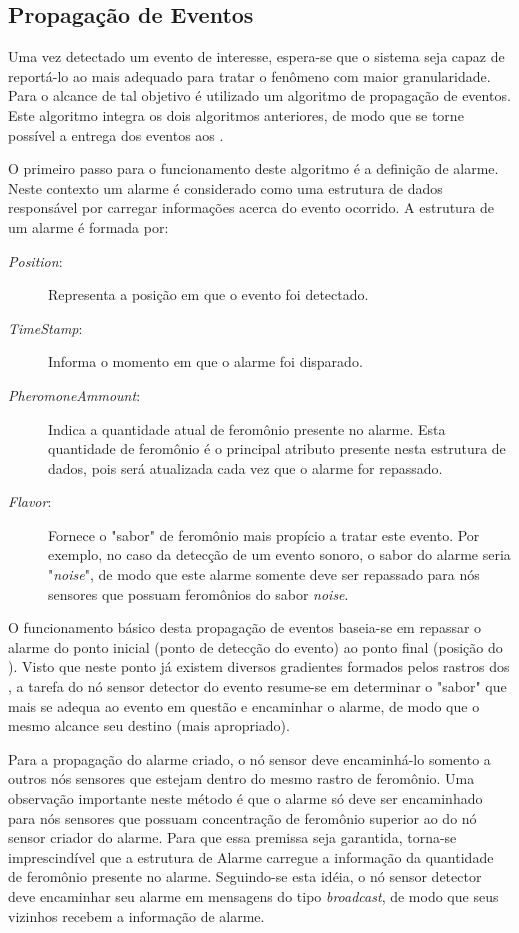 \subsection{Propagação de Eventos}
Uma vez detectado um evento de interesse, espera-se que o sistema seja capaz de reportá-lo ao \vant mais adequado para tratar o fenômeno com maior granularidade. Para o alcance de tal objetivo é utilizado um algoritmo de propagação de eventos. Este algoritmo integra os dois algoritmos anteriores, de modo que se torne possível a entrega dos eventos aos \vants.

O primeiro passo para o funcionamento deste algoritmo é a definição de alarme. Neste contexto um alarme é considerado como uma estrutura de dados responsável por carregar informações acerca do evento ocorrido. A estrutura de um alarme é formada por:

\begin{description}
	\item[\emph{Position}:]  Representa a posição em que o evento foi detectado.
	\item[\emph{TimeStamp}:] Informa o momento em que o alarme foi disparado.
	\item[\emph{PheromoneAmmount}:] Indica a quantidade atual de feromônio presente no alarme. Esta quantidade de feromônio é o principal atributo presente nesta estrutura de dados, pois será atualizada cada vez que o alarme for repassado.
	\item[\emph{Flavor}:] Fornece o "sabor" de feromônio mais propício a tratar este evento. Por exemplo, no caso da detecção de um evento sonoro, o sabor do alarme seria "\emph{noise}", de modo que este alarme somente deve ser repassado para nós sensores que possuam feromônios do sabor \emph{noise}.
\end{description}

O funcionamento básico desta propagação de eventos baseia-se em repassar o alarme do ponto inicial (ponto de detecção do evento) ao ponto final (posição do \vant). Visto que neste ponto já existem diversos gradientes formados pelos rastros dos \vants, a tarefa do nó sensor detector do evento resume-se em determinar o "sabor"  que mais se adequa ao evento em questão e encaminhar o alarme, de modo que o mesmo alcance seu destino (\vant mais apropriado).

Para a propagação do alarme criado, o nó sensor deve encaminhá-lo somento a outros nós sensores que estejam dentro do mesmo rastro de feromônio. Uma observação importante neste método é que o alarme só deve ser encaminhado para nós sensores que possuam concentração de feromônio superior ao do nó sensor criador do alarme. Para que essa premissa seja garantida,  torna-se imprescindível que a estrutura de Alarme carregue a informação da quantidade de feromônio presente no alarme. Seguindo-se esta idéia, o nó sensor detector deve encaminhar seu alarme em mensagens do tipo \emph{broadcast}, de modo que seus vizinhos recebem a informação de alarme. 

